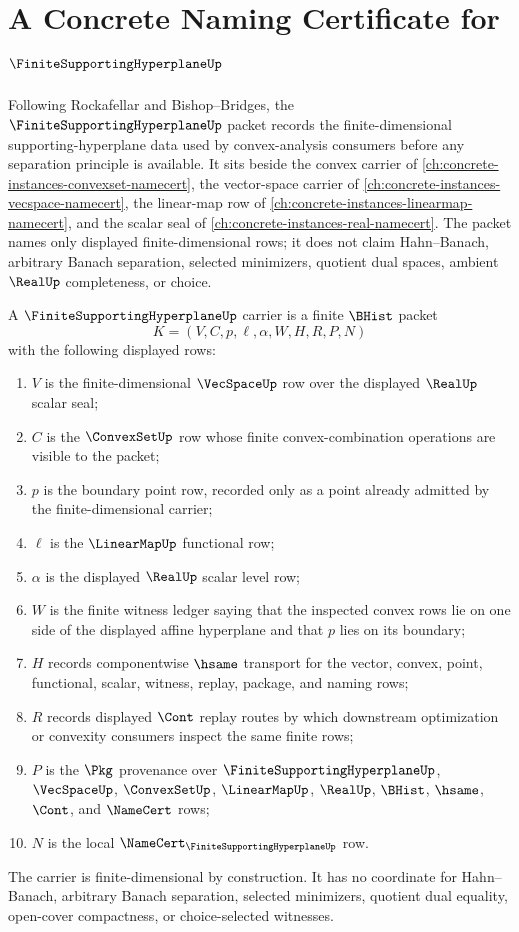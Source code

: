 \chapter{A Concrete Naming Certificate for $\FiniteSupportingHyperplaneUp$}
\label{ch:concrete-instances-finite-supporting-hyperplane-namecert}

Following Rockafellar and Bishop--Bridges, the $\FiniteSupportingHyperplaneUp$ packet records the finite-dimensional supporting-hyperplane data used by convex-analysis consumers before any separation principle is available. It sits beside the convex carrier of \autoref{ch:concrete-instances-convexset-namecert}, the vector-space carrier of \autoref{ch:concrete-instances-vecspace-namecert}, the linear-map row of \autoref{ch:concrete-instances-linearmap-namecert}, and the scalar seal of \autoref{ch:concrete-instances-real-namecert}. The packet names only displayed finite-dimensional rows; it does not claim Hahn--Banach, arbitrary Banach separation, selected minimizers, quotient dual spaces, ambient $\RealUp$ completeness, or choice.

\begin{definition}
\label{def:finite-supporting-hyperplane-packet}
A $\FiniteSupportingHyperplaneUp$ carrier is a finite $\BHist$ packet
$$
K=(V,C,p,\ell,\alpha,W,H,R,P,N)
$$
with the following displayed rows:
\begin{enumerate}
\item $V$ is the finite-dimensional $\VecSpaceUp$ row over the displayed $\RealUp$ scalar seal;
\item $C$ is the $\ConvexSetUp$ row whose finite convex-combination operations are visible to the packet;
\item $p$ is the boundary point row, recorded only as a point already admitted by the finite-dimensional carrier;
\item $\ell$ is the $\LinearMapUp$ functional row;
\item $\alpha$ is the displayed $\RealUp$ scalar level row;
\item $W$ is the finite witness ledger saying that the inspected convex rows lie on one side of the displayed affine hyperplane and that $p$ lies on its boundary;
\item $H$ records componentwise $\hsame$ transport for the vector, convex, point, functional, scalar, witness, replay, package, and naming rows;
\item $R$ records displayed $\Cont$ replay routes by which downstream optimization or convexity consumers inspect the same finite rows;
\item $P$ is the $\Pkg$ provenance over $\FiniteSupportingHyperplaneUp$, $\VecSpaceUp$, $\ConvexSetUp$, $\LinearMapUp$, $\RealUp$, $\BHist$, $\hsame$, $\Cont$, and $\NameCert$ rows;
\item $N$ is the local $\NameCert_{\FiniteSupportingHyperplaneUp}$ row.
\end{enumerate}
The carrier is finite-dimensional by construction. It has no coordinate for Hahn--Banach, arbitrary Banach separation, selected minimizers, quotient dual equality, open-cover compactness, or choice-selected witnesses.
\end{definition}

